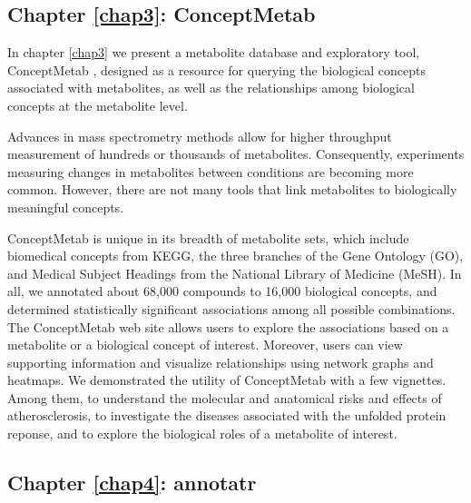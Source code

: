 \subsection{Chapter \ref{chap3}: ConceptMetab}
\label{intro:metab}

In chapter \ref{chap3} we present a metabolite database and exploratory tool, ConceptMetab \cite{Cavalcante:2016cj}, designed as a resource for querying the biological concepts associated with metabolites, as well as the relationships among biological concepts at the metabolite level.

Advances in mass spectrometry methods allow for higher throughput measurement of hundreds or thousands of metabolites. Consequently, experiments measuring changes in metabolites between conditions are becoming more common. However, there are not many tools that link metabolites to biologically meaningful concepts.

ConceptMetab is unique in its breadth of metabolite sets, which include biomedical concepts from KEGG, the three branches of the Gene Ontology (GO), and Medical Subject Headings from the National Library of Medicine (MeSH). In all, we annotated about 68,000 compounds to 16,000 biological concepts, and determined statistically significant associations among all possible combinations. The ConceptMetab web site allows users to explore the associations based on a metabolite or a biological concept of interest. Moreover, users can view supporting information and visualize relationships using network graphs and heatmaps. We demonstrated the utility of ConceptMetab with a few vignettes. Among them, to understand the molecular and anatomical risks and effects of atherosclerosis, to investigate the diseases associated with the unfolded protein reponse, and to explore the biological roles of a metabolite of interest.

\subsection{Chapter \ref{chap4}: annotatr}
\label{intro:annotatr}

